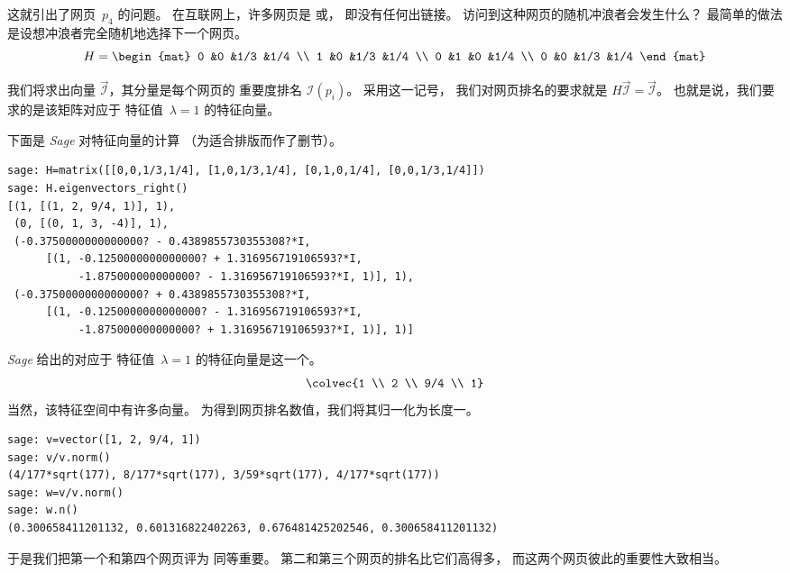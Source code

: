 这就引出了网页~$p_4$ 的问题。
在互联网上，许多网页是
或，
即没有任何出链接。
访问到这种网页的随机冲浪者会发生什么？
最简单的做法是设想冲浪者完全随机地选择下一个网页。
\begin{equation*}
  H=\begin{mat}
    0   &0  &1/3  &1/4   \\
    1   &0  &1/3  &1/4   \\
    0   &1  &0    &1/4 \\
    0   &0  &1/3  &1/4
  \end{mat}
\end{equation*}

我们将求出向量 $\vec{\mathcal{I}}$，其分量是每个网页的
重要度排名 $\mathcal{I}(p_i)$。
采用这一记号，
我们对网页排名的要求就是
$H\vec{\mathcal{I}}=\vec{\mathcal{I}}$。
也就是说，我们要求的是该矩阵对应于
特征值~$\lambda=1$ 的特征向量。

下面是 \textit{Sage} 对特征向量的计算
（为适合排版而作了删节）。
\begin{lstlisting}
sage: H=matrix([[0,0,1/3,1/4], [1,0,1/3,1/4], [0,1,0,1/4], [0,0,1/3,1/4]])   
sage: H.eigenvectors_right()                                                 
[(1, [(1, 2, 9/4, 1)], 1), 
 (0, [(0, 1, 3, -4)], 1), 
 (-0.3750000000000000? - 0.4389855730355308?*I, 
      [(1, -0.1250000000000000? + 1.316956719106593?*I, 
           -1.875000000000000? - 1.316956719106593?*I, 1)], 1), 
 (-0.3750000000000000? + 0.4389855730355308?*I, 
      [(1, -0.1250000000000000? - 1.316956719106593?*I, 
           -1.875000000000000? + 1.316956719106593?*I, 1)], 1)]
\end{lstlisting}
\textit{Sage} 给出的对应于
特征值~$\lambda=1$ 的特征向量是这一个。
\begin{equation*}
  \colvec{1 \\ 2 \\ 9/4 \\ 1}
\end{equation*}
当然，该特征空间中有许多向量。
为得到网页排名数值，我们将其归一化为长度一。
\begin{lstlisting}
sage: v=vector([1, 2, 9/4, 1])
sage: v/v.norm()
(4/177*sqrt(177), 8/177*sqrt(177), 3/59*sqrt(177), 4/177*sqrt(177))
sage: w=v/v.norm()
sage: w.n()
(0.300658411201132, 0.601316822402263, 0.676481425202546, 0.300658411201132)
\end{lstlisting}
于是我们把第一个和第四个网页评为
同等重要。
第二和第三个网页的排名比它们高得多，
而这两个网页彼此的重要性大致相当。

